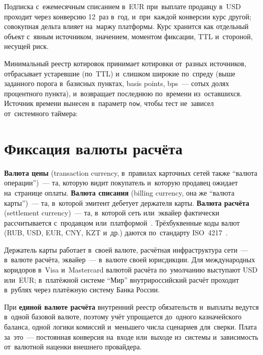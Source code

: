 Подписка с~ежемесячным списанием в~EUR при~выплате продавцу в~USD проходит
через конверсию 12~раз в~год, и~при~каждой конверсии курс другой; совокупная
дельта влияет на~маржу платформы. Курс хранится как отдельный объект с~явным
источником, значением, моментом фиксации, TTL и~стороной, несущей риск.

Минимальный реестр котировок принимает котировки от~разных источников,
отбрасывает устаревшие (по~TTL) и~слишком широкие по~спреду (выше заданного
  порога в~базисных пунктах, basis points, bps~--- сотых долях процентного
пункта), и~возвращает последнюю по~времени из~оставшихся. Источник времени
вынесен в~параметр \texttt{now}, чтобы тест не~зависел от~системного таймера:



\FloatBarrier
\section{Фиксация валюты расчёта}\label{sec:mc-settlement}

\textbf{Валюта цены} (transaction currency, в~правилах карточных сетей также
\enquote{валюта операции})~--- та, которую видит покупатель и~которую продавец
ожидает на~странице оплаты. \textbf{Валюта списания} (billing currency, она же
\enquote{валюта карты})~--- та, в~которой эмитент дебетует держателя карты.
\textbf{Валюта расчёта} (settlement currency)~--- та, в~которой сеть
или~эквайер фактически рассчитывается с~продавцом
или~платформой~\cite{visa-core-rules,mc-rules}. Трёхбуквенные коды валют (RUB, USD,
EUR, CNY, KZT и~др.) даются по~стандарту ISO~4217~\cite{iso-4217}.

Держатель карты работает в~своей валюте, расчётная инфраструктура сети~---
в~валюте расчёта, эквайер~--- в~валюте своей юрисдикции. Для международных
коридоров в~Visa и~Mastercard валютой расчёта по~умолчанию выступают USD
или~EUR; в~платёжной системе \enquote{Мир} внутрироссийский расчёт проходит
в~рублях через платёжную систему Банка России.

При \textbf{единой валюте расчёта} внутренний реестр обязательств и~выплаты
ведутся в~одной базовой валюте, поэтому учёт упрощается до~одного казначейского
баланса, одной логики комиссий и~меньшего числа сценариев для~сверки. Плата
за~это~--- постоянная конверсия на~входе или~выходе из~системы
и~зависимость от~валютной наценки внешнего провайдера.


